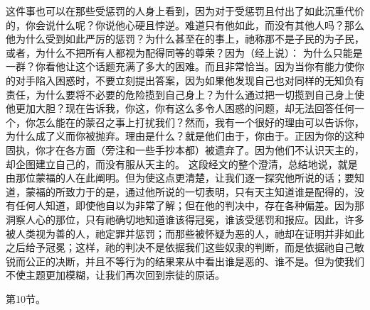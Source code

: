 这件事也可以在那些受惩罚的人身上看到，因为对于受惩罚且付出了如此沉重代价的，你会说什么呢？你说他心硬且悖逆。难道只有他如此，而没有其他人吗？那么他为什么受到如此严厉的惩罚？为什么甚至在的事上，祂称那不是子民的为子民，或者，为什么不把所有人都视为配得同等的尊荣？因为（经上说）： 为什么只能是一群？你看他让这个话题充满了多大的困难。而且非常恰当。因为当你有能力使你的对手陷入困惑时，不要立刻提出答案，因为如果他发现自己也对同样的无知负有责任，为什么要将不必要的危险揽到自己身上？为什么通过把一切揽到自己身上使他更加大胆？现在告诉我，你这，你有这么多令人困惑的问题，却无法回答任何一个，你怎么能在的蒙召之事上打扰我们？然而，我有一个很好的理由可以告诉你，为什么成了义而你被抛弃。理由是什么？就是他们由于，你由于。正因为你的这种固执，你才在各方面（旁注和一些手抄本都）被遗弃了。因为他们不认识天主的，却企图建立自己的，而没有服从天主的。 这段经文的整个澄清，总结地说，就是由那位蒙福的人在此阐明。但为使这点更清楚，让我们逐一探究他所说的话；要知道，蒙福的所致力于的是，通过他所说的一切表明，只有天主知道谁是配得的，没有任何人知道，即使他自以为非常了解；但在他的判决中，存在各种偏差。因为那洞察人心的那位，只有祂确切地知道谁该得冠冕，谁该受惩罚和报应。因此，许多被人类视为善的人，祂定罪并惩罚；而那些被怀疑为恶的人，祂却在证明并非如此之后给予冠冕；这样，祂的判决不是依据我们这些奴隶的判断，而是依据祂自己敏锐而公正的决断，并且不等行为的结果来从中看出谁是恶的、谁不是。但为使我们不使主题更加模糊，让我们再次回到宗徒的原话。\par

第10节。\par

